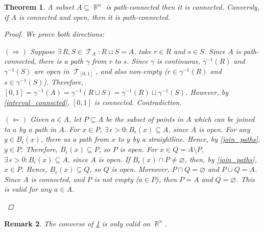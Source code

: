 \documentclass[12pt]{article}
\let\emptyset\varnothing
\let\RA\Rightarrow
\let\LA\Leftarrow
\let\ee\epsilon
\newcommand{\Exist}[1]{\exists\,{#1}:}
\DeclareMathOperator{\R}{\mathbb{R}}
\DeclareMathOperator{\T}{\mathcal{T}}
\newtheorem{theorem}{Theorem}[subsection]
\newtheorem{remark}[theorem]{Remark}
\begin{document}
\begin{theorem}
  \label{eq_connect}
  A subset $A\subseteq\R^n$ is path-connected then it is connected. Conversly, if $A$ is connected and open, then it is path-connected.
  \begin{proof}
    We prove both directions:
    \begin{compactitem}
      \item[$(\RA)$] Suppose $\Exist{R,S\in \T_A}R\sqcup S=A$, take $r\in R$ and $s\in S$. Since $A$ is path-connected, there is a path $\gamma$ from $r$ to $s$. Since $\gamma$ is continuous, $\gamma^{-1}(R)$ and $\gamma^{-1}(S)$ are open in $\T_{[0,1]}$, and also non-empty ($r\in\gamma^{-1}(R)$ and $s\in\gamma^{-1}(S)$). Therefore, $[0,1]=\gamma^{-1}(A)=\gamma^{-1}(R\sqcup S)=\gamma^{-1}(R)\sqcup \gamma^{-1}(S)$. However, by \ref{interval_connected}, $[0,1]$ is connected. Contradiction.
      \item[$(\LA)$] Given $a\in A$, let $P\subseteq A$ be the subset of points in $A$ which can be joined to $a$ by a path in $A$. For $x\in P$, $\Exist{\ee>0}B_\ee(x)\subseteq A$, since $A$ is open. For any $y\in B_\ee(x)$, there us a path from $x$ to $y$ by a straightline. Hence, by \ref{join_paths}, $y\in P$. Therefore, $B_\ee(x)\subseteq P$, so $P$ is open. For $x\in Q=A\setminus P$, $\Exist{\ee>0}B_\ee(x)\subseteq A$, since $A$ is open. If $B_\ee(x)\cap P\neq \emptyset$, then, by \ref{join_paths}, $x\in P$. Hence, $B_\ee(x)\subseteq Q$, so $Q$ is open. Moreover, $P\cap Q=\emptyset$ and $P\cup Q=A$. Since $A$ is connected, and $P$ is not empty ($a\in P$), then $P=A$ and $Q=\emptyset$. This is valid for any $a\in A$.
    \end{compactitem}
  \end{proof}
\end{theorem}

\begin{remark}
  The converse of \ref{eq_connect} is only valid on $\R^n$.
\end{remark}
\end{document}

